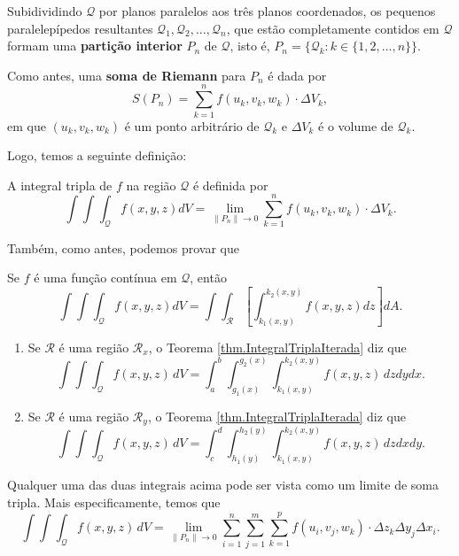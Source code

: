 Subidividindo \(\mathcal{Q}\) por planos paralelos aos três planos coordenados, os pequenos paralelepípedos resultantes \(\mathcal{Q}_1,\mathcal{Q}_2,\dots, \mathcal{Q}_n\), que estão completamente contidos em \(\mathcal{Q}\) formam uma \textbf{partição interior} \(P_n\) de \(\mathcal{Q}\), isto é, \(P_n = \{\mathcal{Q}_k : k\in\{1,2,\dots,n\}\}\). 

Como antes, uma \textbf{soma de Riemann} para \(P_n\) é dada por \[S(P_n) = \sum_{k=1}^{n} f(u_k,v_k,w_k)\cdot\Delta V_k,\] em que \((u_k,v_k,w_k)\) é um ponto arbitrário de \(\mathcal{Q}_k\) e \(\Delta V_k\) é o volume de \(\mathcal{Q}_k\).

Logo, temos a seguinte definição:
\begin{definition}
    A integral tripla  de \(f\) na região \(\mathcal{Q}\) é definida por \[\int\int\int_\mathcal{Q} f(x,y,z) dV = \lim_{\|P_n\|\to 0} \sum_{k=1}^{n} f(u_k,v_k,w_k)\cdot\Delta V_k.\]
\end{definition}

Também, como antes, podemos provar que 
\begin{theorem}\label{thm.IntegralTriplaIterada}
    Se \(f\) é uma função contínua em \(\mathcal{Q}\), então \[\int\int\int_\mathcal{Q} f(x,y,z) dV = \int\int_\mathcal{R} \left[ \int_{k_1(x,y)}^{k_2(x,y)} f(x,y,z) dz \right] dA. \]
\end{theorem}

\begin{remark}
    \begin{enumerate}
        \item[a)] Se \(\mathcal{R}\) é uma região \(\mathcal{R}_x\), o Teorema \ref{thm.IntegralTriplaIterada} diz que \[\int\int\int_\mathcal{Q} f(x,y,z)\, dV = \int_a^b \int_{g_1(x)}^{g_2(x)}\int_{k_1(x,y)}^{k_2(x,y)} f(x,y,z)\, dz dy dx.\] %
        \item[b)] Se \(\mathcal{R}\) é uma região \(\mathcal{R}_y\), o Teorema \ref{thm.IntegralTriplaIterada} diz que \[\int\int\int_\mathcal{Q} f(x,y,z)\, dV = \int_c^d \int_{h_1(y)}^{h_2(y)}\int_{k_1(x,y)}^{k_2(x,y)} f(x,y,z)\, dz dx dy.\] %
    \end{enumerate}

    Qualquer uma das duas integrais acima pode ser vista como um limite de soma tripla. Mais especificamente, temos que \[\int\int\int_\mathcal{Q} f(x,y,z)\, dV = \lim_{\|P_n\|\to 0} \sum_{i=1}^{n} \sum_{j=1}^{m} \sum_{k=1}^{p} f(u_i,v_j,w_k)\cdot \Delta z_k \Delta y_j \Delta x_i.\]
\end{remark}

